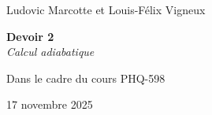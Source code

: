\newcommand{\madate}{17 novembre 2025}
\begin{titlepage}
    \begin{center}
       Ludovic Marcotte et Louis-Félix Vigneux

       \vspace{8 cm}

       \textbf{Devoir 2} \\
       \textit{Calcul adiabatique}

       \vspace{8 cm}

       Dans le cadre du cours PHQ-598 \\

       \vspace{3cm}

       \madate
    \end{center}
\end{titlepage}